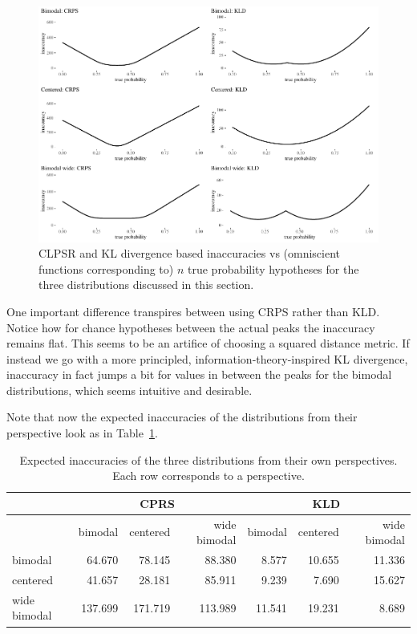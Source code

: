 \documentclass[
  10pt,
  dvipsnames,enabledeprecatedfontcommands]{scrartcl}
\begin{document}
\begin{figure}[H]

\begin{center}\includegraphics[width=1\linewidth]{imprecision_philosophical_paper2_files/figure-latex/figinaccuracies2-1} \end{center}


\caption{CLPSR and KL divergence based inaccuracies vs (omniscient functions corresponding to) $n$ true 
probability hypotheses for the three distributions discussed in this section.}
\label{fig:inaccuracies2}
\end{figure}

One important difference transpires between using CRPS rather than KLD.
Notice how for chance hypotheses between the actual peaks the inaccuracy
remains flat. This seems to be an artifice of choosing a squared
distance metric. If instead we go with a more principled,
information-theory-inspired KL divergence, inaccuracy in fact jumps a
bit for values in between the peaks for the bimodal distributions, which
seems intuitive and desirable.

Note that now the expected inaccuracies of the distributions from their
perspective look as in \mbox{Table \ref{tab:expected2}.}

\begin{table}[H]
\begin{tabular}{lrrrrrr}
& \multicolumn{3}{c}{CPRS} & \multicolumn{3}{c}{KLD} \\
\toprule
  & bimodal & centered & wide bimodal & bimodal & centered & wide bimodal\\
\midrule
bimodal & 64.670 & 78.145 & 88.380 & 8.577 & 10.655 & 11.336\\
centered & 41.657 & 28.181 & 85.911 & 9.239 & 7.690 & 15.627\\
wide bimodal & 137.699 & 171.719 & 113.989 & 11.541 & 19.231 & 8.689\\
\bottomrule
\end{tabular}
\caption{Expected inaccuracies of the three distributions from their own perspectives.
 Each row corresponds to a perspective.}
\label{tab:expected2}
\end{table}
\end{document}
